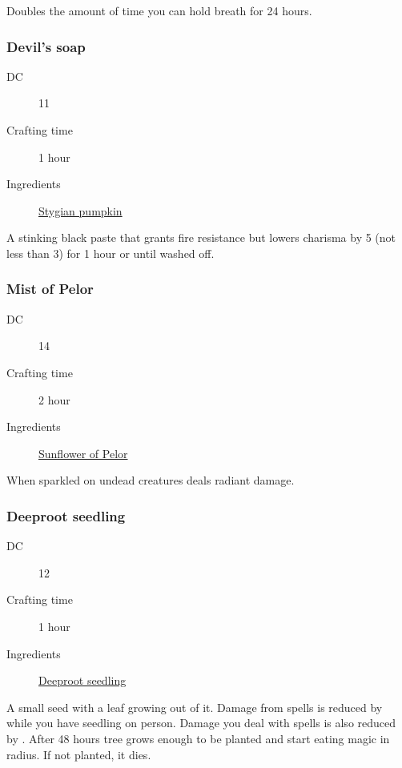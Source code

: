 Doubles the amount of time you can hold breath for 24 hours.

\subsubsection{Devil's soap}
\label{Devil's soap}

\begin{description}
\item [DC] 11
\item [Crafting time] 1 hour
\item [Ingredients] \hyperref[Stygian Pumpkin]{Stygian pumpkin}
\end{description}

A stinking black paste that grants fire resistance but lowers charisma by 5 (not less than 3)
for 1 hour or until washed off.

\subsubsection{Mist of Pelor}
\label{Mist of Pelor}

\begin{description}
\item [DC] 14
\item [Crafting time] 2 hour
\item [Ingredients] \hyperref[Sunflower of Pelor]{Sunflower of Pelor}
\end{description}

When sparkled on undead creatures deals  radiant damage.

\subsubsection{Deeproot seedling}
\label{Deeproot seedling}

\begin{description}
\item [DC] 12
\item [Crafting time] 1 hour
\item [Ingredients] \hyperref[Sussur]{Deeproot seedling}
\end{description}

A small seed with a leaf growing out of it. 
Damage from spells is reduced by  while you have seedling on person. 
Damage you deal with spells is also reduced by . 
After 48 hours tree grows enough to be planted and start eating magic in radius. 
If not planted, it dies.

